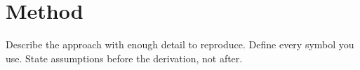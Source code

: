 \section{Method}\label{sec:method}

Describe the approach with enough detail to reproduce.
Define every symbol you use.
State assumptions before the derivation, not after.
